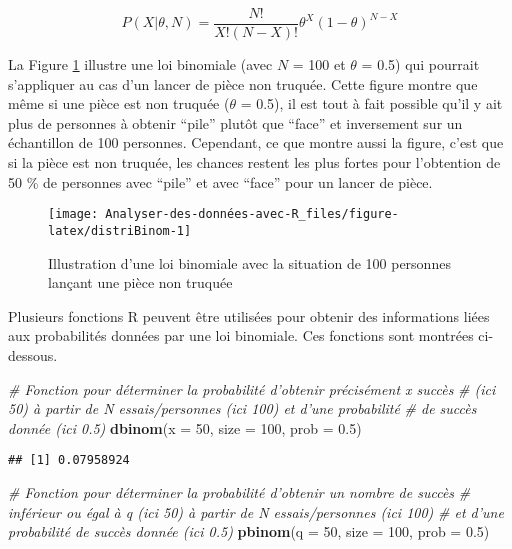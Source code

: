 \documentclass[
  french,
]{book}
\newenvironment{Shaded}{\begin{snugshade}}{\end{snugshade}}
\newcommand{\CommentTok}[1]{\textcolor[rgb]{0.56,0.35,0.01}{\textit{#1}}}
\newcommand{\DataTypeTok}[1]{\textcolor[rgb]{0.13,0.29,0.53}{#1}}
\newcommand{\DecValTok}[1]{\textcolor[rgb]{0.00,0.00,0.81}{#1}}
\newcommand{\FloatTok}[1]{\textcolor[rgb]{0.00,0.00,0.81}{#1}}
\newcommand{\KeywordTok}[1]{\textcolor[rgb]{0.13,0.29,0.53}{\textbf{#1}}}
\newcommand{\NormalTok}[1]{#1}
\begin{document}
\[P(X | \theta, N) = \frac{N!}{X!(N-X)!}\theta^X(1-\theta)^{N-X}\]

La Figure \ref{fig:distriBinom} illustre une loi binomiale (avec \(N\) = 100 et \(\theta\) = 0.5) qui pourrait s'appliquer au cas d'un lancer de pièce non truquée. Cette figure montre que même si une pièce est non truquée (\(\theta\) = 0.5), il est tout à fait possible qu'il y ait plus de personnes à obtenir \enquote{pile} plutôt que \enquote{face} et inversement sur un échantillon de 100 personnes. Cependant, ce que montre aussi la figure, c'est que si la pièce est non truquée, les chances restent les plus fortes pour l'obtention de 50 \% de personnes avec \enquote{pile} et avec \enquote{face} pour un lancer de pièce.

\begin{figure}

{\centering \texttt{[image: Analyser-des-données-avec-R\_files/figure-latex/distriBinom-1]} 

}

\caption{Illustration d'une loi binomiale avec la situation de 100 personnes lançant une pièce non truquée}\label{fig:distriBinom}
\end{figure}

Plusieurs fonctions R peuvent être utilisées pour obtenir des informations liées aux probabilités données par une loi binomiale. Ces fonctions sont montrées ci-dessous.

\begin{Shaded}
\begin{Highlighting}[]
\CommentTok{# Fonction pour déterminer la probabilité d'obtenir précisément x succès }
\CommentTok{# (ici 50) à partir de N essais/personnes (ici 100) et d'une probabilité }
\CommentTok{# de succès donnée (ici 0.5)}
\KeywordTok{dbinom}\NormalTok{(}\DataTypeTok{x =} \DecValTok{50}\NormalTok{, }\DataTypeTok{size =} \DecValTok{100}\NormalTok{, }\DataTypeTok{prob =} \FloatTok{0.5}\NormalTok{)}
\end{Highlighting}
\end{Shaded}

\begin{verbatim}
## [1] 0.07958924
\end{verbatim}

\begin{Shaded}
\begin{Highlighting}[]
\CommentTok{# Fonction pour déterminer la probabilité d'obtenir un nombre de succès}
\CommentTok{# inférieur ou égal à q (ici 50) à partir de N essais/personnes (ici 100) }
\CommentTok{# et d'une probabilité de succès donnée (ici 0.5)}
\KeywordTok{pbinom}\NormalTok{(}\DataTypeTok{q =} \DecValTok{50}\NormalTok{, }\DataTypeTok{size =} \DecValTok{100}\NormalTok{, }\DataTypeTok{prob =} \FloatTok{0.5}\NormalTok{)}
\end{Highlighting}
\end{Shaded}
\end{document}
